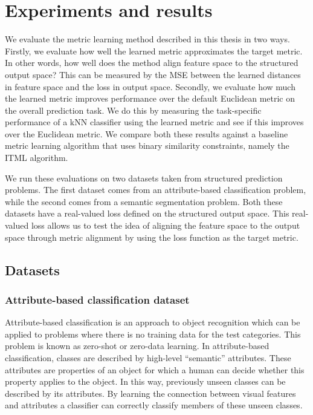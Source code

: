 \chapter{Experiments and results}

We evaluate the metric learning method described in this thesis in two ways. Firstly, we evaluate how well the learned metric approximates the target metric. In other words, how well does the method align feature space to the structured output space? This can be measured by the \acf{MSE} between the learned distances in feature space and the loss in output space. Secondly, we evaluate how much the learned metric improves performance over the default Euclidean metric on the overall prediction task. We do this by measuring the task-specific performance of a \ac{kNN} classifier using the learned metric and see if this improves over the Euclidean metric. We compare both these results against a baseline metric learning algorithm that uses binary similarity constraints, namely the ITML algorithm. \cite{davis2007information}

We run these evaluations on two datasets taken from structured prediction problems. The first dataset comes from an attribute-based classification problem, while the second comes from a semantic segmentation problem. Both these datasets have a real-valued loss defined on the structured output space. This real-valued loss allows us to test the idea of aligning the feature space to the output space through metric alignment by using the loss function as the target metric.



\section{Datasets}


\subsection{Attribute-based classification dataset}

Attribute-based classification is an approach to object recognition which can be applied to problems where there is no training data for the test categories. This problem is known as zero-shot or zero-data learning. In attribute-based classification, classes are described by high-level ``semantic'' attributes. These attributes are properties of an object for which a human can decide whether this property applies to the object. In this way, previously unseen classes can be described by its attributes. By learning the connection between visual features and attributes a classifier can correctly classify members of these unseen classes. 

